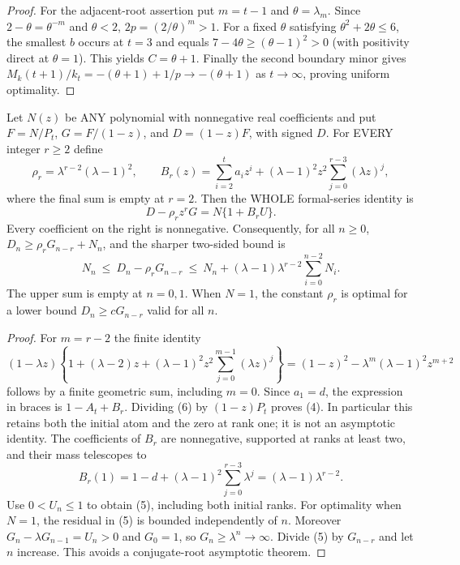 \begin{proof}
For the adjacent-root assertion put $m=t-1$ and
$\theta=\lambda_m$. Since $2-\theta=\theta^{-m}$ and $\theta<2$,
$2p=(2/\theta)^m>1$. For a fixed $\theta$ satisfying
$\theta^2+2\theta\le6$, the smallest $b$ occurs at $t=3$ and equals
$7-4\theta\ge(\theta-1)^2>0$ (with positivity direct at $\theta=1$).
This yields $C=\theta+1$. Finally the second boundary minor gives
$M_k(t+1)/k_t=-(\theta+1)+1/p\longrightarrow-(\theta+1)$ as
$t\to\infty$, proving uniform optimality.
\end{proof}

\begin{theorem}
Let $N(z)$ be ANY polynomial with nonnegative real coefficients and put
$F=N/P_t$, $G=F/(1-z)$, and $D=(1-z)F$, with signed $D$.
For EVERY integer $r\ge2$ define
\[
 \rho_r=\lambda^{r-2}(\lambda-1)^2,\qquad
 B_r(z)=\sum_{i=2}^t a_i z^i+
       (\lambda-1)^2z^2\sum_{j=0}^{r-3}(\lambda z)^j,
\]
where the final sum is empty at $r=2$. Then the WHOLE formal-series
identity is
\[
                 D-\rho_r z^rG=N\{1+B_r U\}.             \tag{4}
\]
Every coefficient on the right is nonnegative. Consequently, for all
$n\ge0$, $D_n\ge\rho_r G_{n-r}+N_n$, and the sharper two-sided bound is
\[
 N_n\ \le\ D_n-\rho_r G_{n-r}\ \le\
 N_n+(\lambda-1)\lambda^{r-2}\sum_{i=0}^{n-2}N_i.           \tag{5}
\]
The upper sum is empty at $n=0,1$. When $N=1$, the constant $\rho_r$
is optimal for a lower bound $D_n\ge cG_{n-r}$ valid for all $n$.
\end{theorem}
\begin{proof}
For $m=r-2$ the finite identity
\[
 (1-\lambda z)\left\{1+(\lambda-2)z+
 (\lambda-1)^2z^2\sum_{j=0}^{m-1}(\lambda z)^j\right\}
     =(1-z)^2-\lambda^m(\lambda-1)^2z^{m+2}
                                                               \tag{6}
\]
follows by a finite geometric sum, including $m=0$. Since $a_1=d$,
the expression in braces is $1-A_t+B_r$. Dividing (6) by
$(1-z)P_t$ proves (4). In particular this retains both the initial
atom and the zero at rank one; it is not an asymptotic identity.
The coefficients of $B_r$ are nonnegative, supported at ranks at
least two, and their mass telescopes to
\[
 B_r(1)=1-d+(\lambda-1)^2\sum_{j=0}^{r-3}\lambda^j
                         =(\lambda-1)\lambda^{r-2}.
\]
Use $0<U_n\le1$ to obtain (5), including both initial ranks.
For optimality when $N=1$, the residual in (5) is bounded independently
of $n$. Moreover $G_n-\lambda G_{n-1}=U_n>0$ and $G_0=1$, so
$G_n\ge\lambda^n\to\infty$. Divide (5) by $G_{n-r}$ and let $n$
increase. This avoids a conjugate-root asymptotic theorem.
\end{proof}

